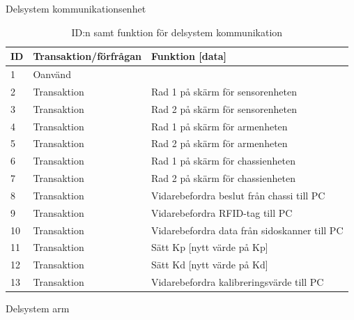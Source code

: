 Delsystem kommunikationsenhet

\begin{table}[H]
\centering
\label{callbacks-komm}
\begin{tabularx}{\textwidth}{|l|l|X|}
\hline
\textbf{ID} & \textbf{Transaktion/förfrågan} & \textbf{Funktion [data]} \\ \hline
1 & Oanvänd & \\ \hline
2 & Transaktion & Rad 1 på skärm för sensorenheten \\ \hline
3 & Transaktion & Rad 2 på skärm för sensorenheten \\ \hline
4 & Transaktion & Rad 1 på skärm för armenheten \\ \hline
5 & Transaktion & Rad 2 på skärm för armenheten \\ \hline
6 & Transaktion & Rad 1 på skärm för chassienheten \\ \hline
7 & Transaktion & Rad 2 på skärm för chassienheten \\ \hline
8 & Transaktion & Vidarebefordra beslut från chassi till PC \\ \hline
9 & Transaktion & Vidarebefordra RFID-tag till PC\\ \hline
10 & Transaktion & Vidarebefordra data från sidoskanner till PC \\ \hline
11 & Transaktion & Sätt Kp [nytt värde på Kp] \\ \hline
12 & Transaktion & Sätt Kd [nytt värde på Kd] \\ \hline
13 & Transaktion & Vidarebefordra kalibreringsvärde till PC \\ \hline
\end{tabularx}
\caption{ID:n samt funktion för delsystem kommunikation}
\end{table}

Delsystem arm

